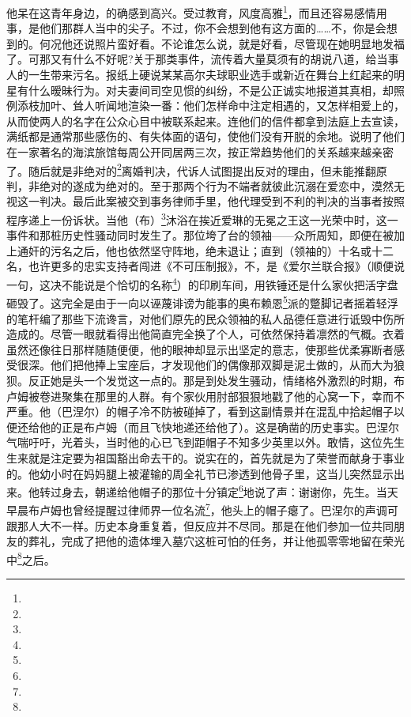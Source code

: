 \par 他呆在这青年身边，的确感到高兴。受过教育，风度高雅\footnote{}，而且还容易感情用事，是他们那群人当中的尖子。不过，你不会想到他有这方面的……不，你是会想到的。何况他还说照片蛮好看。不论谁怎么说，就是好看，尽管现在她明显地发福了。可那又有什么不好呢?关于那类事件，流传着大量莫须有的胡说八道，给当事人的一生带来污名。报纸上硬说某某高尔夫球职业选手或新近在舞台上红起来的明星有什么暧昧行为。对夫妻间司空见惯的纠纷，不是公正诚实地报道其真相，却照例添枝加叶、耸人听闻地渲染一番：他们怎样命中注定相遇的，又怎样相爱上的，从而使两人的名字在公众心目中被联系起来。连他们的信件都拿到法庭上去宣读，满纸都是通常那些感伤的、有失体面的语句，使他们没有开脱的余地。说明了他们在一家著名的海滨旅馆每周公开同居两三次，按正常趋势他们的关系越来越亲密了。随后就是非绝对的\footnote{}离婚判决，代诉人试图提出反对的理由，但未能推翻原判，非绝对的遂成为绝对的。至于那两个行为不端者就彼此沉溺在爱恋中，漠然无视这一判决。最后此案被交到事务律师手里，他代理受到不利的判决的当事者按照程序递上一份诉状。当他（布）\footnote{}沐浴在挨近爱琳的无冕之王这一光荣中时，这一事件和那桩历史性骚动同时发生了。那位垮了台的领袖——众所周知，即便在被加上通奸的污名之后，他也依然坚守阵地，绝未退让；直到（领袖的）十名或十二名，也许更多的忠实支持者闯进《不可压制报》，不，是《爱尔兰联合报》（顺便说一句，这决不能说是个恰切的名称\footnote{}）的印刷车间，用铁锤还是什么家伙把活字盘砸毁了。这完全是由于一向以诬蔑诽谤为能事的奥布赖恩\footnote{}派的蹩脚记者摇着轻浮的笔杆编了那些下流谗言，对他们原先的民众领袖的私人品德任意进行诋毁中伤所造成的。尽管一眼就看得出他简直完全换了个人，可依然保持着凛然的气概。衣着虽然还像往日那样随随便便，他的眼神却显示出坚定的意志，使那些优柔寡断者感受很深。他们把他捧上宝座后，才发现他们的偶像那双脚是泥土做的，从而大为狼狈。反正她是头一个发觉这一点的。那是到处发生骚动，情绪格外激烈的时期，布卢姆被卷进聚集在那里的人群。有个家伙用肘部狠狠地戳了他的心窝一下，幸而不严重。他（巴涅尔）的帽子冷不防被碰掉了，看到这副情景并在混乱中拾起帽子以便还给他的正是布卢姆（而且飞快地递还给他了）。这是确凿的历史事实。巴涅尔气喘吁吁，光着头，当时他的心已飞到距帽子不知多少英里以外。敢情，这位先生生来就是注定要为祖国豁出命去干的。说实在的，首先就是为了荣誉而献身于事业的。他幼小时在妈妈腿上被灌输的周全礼节已渗透到他骨子里，这当儿突然显示出来。他转过身去，朝递给他帽子的那位十分镇定\footnote{}地说了声：谢谢你，先生。当天早晨布卢姆也曾经提醒过律师界一位名流\footnote{}，他头上的帽子瘪了。巴涅尔的声调可跟那人大不一样。历史本身重复着，但反应并不尽同。那是在他们参加一位共同朋友的葬礼，完成了把他的遗体埋入墓穴这桩可怕的任务，并让他孤零零地留在荣光中\footnote{}之后。
